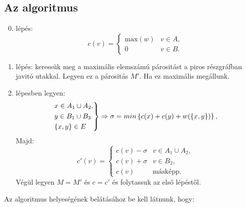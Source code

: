 \subsection{Az algoritmus}
\begin{enumerate}
  \setcounter{enumi}{-1}
  \item lépés:  \begin{displaymath}
  c(v)=\begin{cases}
  \mbox{max}(w) & v \in A, \\
  0             & v \in B.
  \end{cases} 
  \end{displaymath}
  \item lépés: keressük meg a maximális elemszámú párositást a piros részgráfban
  javitó utakkal.
  Legyen ez a párositás $M'$. Ha ez maximális megállunk.
  \item lépesben legyen:
  \begin{displaymath}
  \begin{rcases}
  x \in A_1 \cup A_2, \\
  y \in B_1 \cup B_3\\
  \{x,y\} \in E
  \end{rcases}
  \Rightarrow \sigma= min\left\{c(x) + c(y) + w(\left\{x,y\right\}) \right\},
  \end{displaymath}
  Majd: \begin{displaymath}
  c'(v)=\begin{cases}
  c(v)-\sigma & v \in A_1 \cup A_2, \\
  c(v)+\sigma & v \in B_2, \\
  c(v) 		   &  \mbox{másképp.}
  \end{cases} 
  \end{displaymath}
  Végül legyen $M=M'$ és $c=c'$ és folytassuk az első lépéstől.
\end{enumerate} 

Az algoritmus helyeségének belátásához be kell látnunk, hogy:

